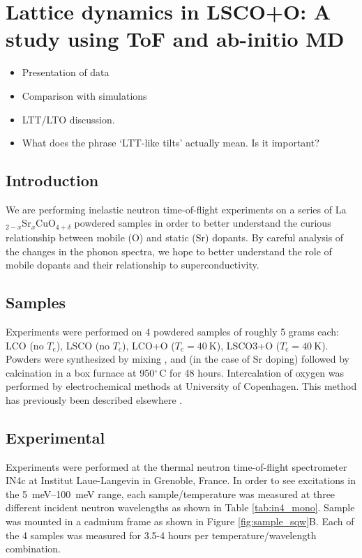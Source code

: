 \chapter{Lattice dynamics in LSCO+O: A study using ToF and ab-initio MD}\label{ch:in4}

\begin{framed}
    \begin{itemize}
        \item Presentation of data
        \item Comparison with simulations
        \item LTT/LTO discussion. 
        \item What does the phrase `LTT-like tilts' actually mean. Is it important?
    \end{itemize}
\end{framed}


\section{Introduction}
We are performing inelastic neutron time-of-flight experiments on a series of La$_{2-x}$Sr$_{x}$CuO$_{4+\delta}$ powdered samples in order to better understand the curious relationship between mobile (O) and static (Sr) dopants. By careful analysis of the changes in the phonon spectra, we hope to better understand the role of mobile dopants and their relationship to superconductivity.

\section{Samples}
Experiments were performed on 4 powdered samples of roughly 5 grams each: LCO (no $T_\text{c}$), LSCO (no $T_\text{c}$), LCO+O ($T_\text{c} = \SI{40}{\kelvin}$), LSCO3+O ($T_\text{c} = \SI{40}{\kelvin}$). Powders were synthesized by mixing ,  and (in the case of Sr doping)  followed by calcination in a box furnace at 950$^\circ \, \text{C}$ for 48 hours. Intercalation of oxygen was performed by electrochemical methods at University of Copenhagen. This method has previously been described elsewhere \cite{Blakeslee1998}.

\section{Experimental}
Experiments were performed at the thermal neutron time-of-flight spectrometer IN4c at Institut Laue-Langevin in Grenoble, France. In order to see excitations in the \SIrange{5}{100}{\milli\eV} range, each sample/temperature was measured at three different incident neutron wavelengths as shown in Table \ref{tab:in4_mono}. Sample was mounted in a cadmium frame as shown in Figure \ref{fig:sample_sqw}B. Each of the 4 samples was measured for 3.5-4 hours per temperature/wavelength combination. 


